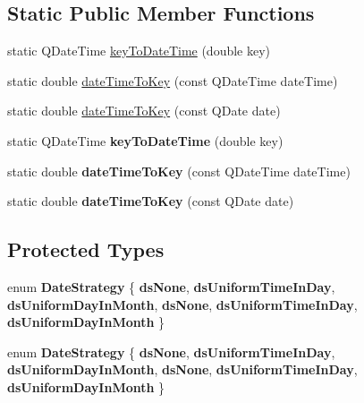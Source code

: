 \subsection*{Static Public Member Functions}
\begin{DoxyCompactItemize}
\item 
static Q\+Date\+Time \hyperlink{class_q_c_p_axis_ticker_date_time_a4c1761ad057f5564804a53f942629b53}{key\+To\+Date\+Time} (double key)
\item 
static double \hyperlink{class_q_c_p_axis_ticker_date_time_aa24f293f16fff0f937bf71f4140033f1}{date\+Time\+To\+Key} (const Q\+Date\+Time date\+Time)
\item 
static double \hyperlink{class_q_c_p_axis_ticker_date_time_ad87afc7dba65843f68da5ca88bc004f4}{date\+Time\+To\+Key} (const Q\+Date date)
\item 
\mbox{\label{class_q_c_p_axis_ticker_date_time_a611fe16e483e6dc953252b16c06c6822}} 
static Q\+Date\+Time {\bfseries key\+To\+Date\+Time} (double key)
\item 
\mbox{\label{class_q_c_p_axis_ticker_date_time_a4f8c046473805fd1d973e0f1817f84e5}} 
static double {\bfseries date\+Time\+To\+Key} (const Q\+Date\+Time date\+Time)
\item 
\mbox{\label{class_q_c_p_axis_ticker_date_time_a1d8101ae5dd72f1b6d2bb25ad4678e0b}} 
static double {\bfseries date\+Time\+To\+Key} (const Q\+Date date)
\end{DoxyCompactItemize}
\subsection*{Protected Types}
\begin{DoxyCompactItemize}
\item 
\mbox{\label{class_q_c_p_axis_ticker_date_time_af2c7c60821a6234ca7a172f42ef7f1d8}} 
enum {\bfseries Date\+Strategy} \{ \newline
{\bfseries ds\+None}, 
{\bfseries ds\+Uniform\+Time\+In\+Day}, 
{\bfseries ds\+Uniform\+Day\+In\+Month}, 
{\bfseries ds\+None}, 
\newline
{\bfseries ds\+Uniform\+Time\+In\+Day}, 
{\bfseries ds\+Uniform\+Day\+In\+Month}
 \}
\item 
\mbox{\label{class_q_c_p_axis_ticker_date_time_af2c7c60821a6234ca7a172f42ef7f1d8}} 
enum {\bfseries Date\+Strategy} \{ \newline
{\bfseries ds\+None}, 
{\bfseries ds\+Uniform\+Time\+In\+Day}, 
{\bfseries ds\+Uniform\+Day\+In\+Month}, 
{\bfseries ds\+None}, 
\newline
{\bfseries ds\+Uniform\+Time\+In\+Day}, 
{\bfseries ds\+Uniform\+Day\+In\+Month}
 \}
\end{DoxyCompactItemize}
